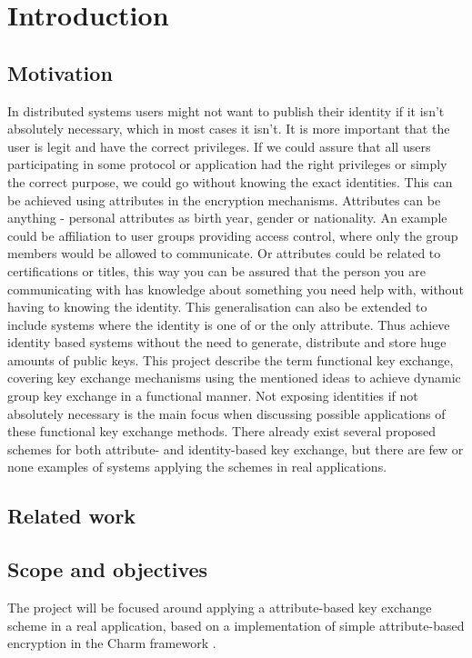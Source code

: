 \chapter{Introduction}
\label{chp:intro} 
\section{Motivation}
In distributed systems users might not want to publish their identity if it isn't absolutely necessary, which in most cases it isn't. It is more important that the user is legit and have the correct privileges. If we could assure that all users participating in some protocol or application had the right privileges or simply the correct purpose, we could go without knowing the exact identities. This can be achieved using attributes in the encryption mechanisms. Attributes can be anything - personal attributes as birth year, gender or nationality. An example could be affiliation to user groups providing access control, where only the group members would be allowed to communicate. Or attributes could be related to certifications or titles, this way you can be assured that the person you are communicating with has knowledge about something you need help with, without having to knowing the identity. This generalisation can also be extended to include systems where the identity is one of or the only attribute. Thus achieve identity based systems without the need to generate, distribute and store huge amounts of public keys. This project describe the term functional key exchange, covering key exchange mechanisms using the mentioned ideas to achieve dynamic group key exchange in a functional manner. Not exposing identities if not absolutely necessary is the main focus when discussing possible applications of these functional key exchange methods. There already exist several proposed schemes for both attribute- and identity-based key exchange, but there are few or none examples of systems applying the schemes in real applications. 

\section{Related work}\label{sec:related_work}


\section{Scope and objectives}\label{sec:scope}

The project will be focused around applying a attribute-based key exchange scheme in a real application, based on a implementation of simple attribute-based encryption in the Charm framework \cite{DBLP:Charm13}.


